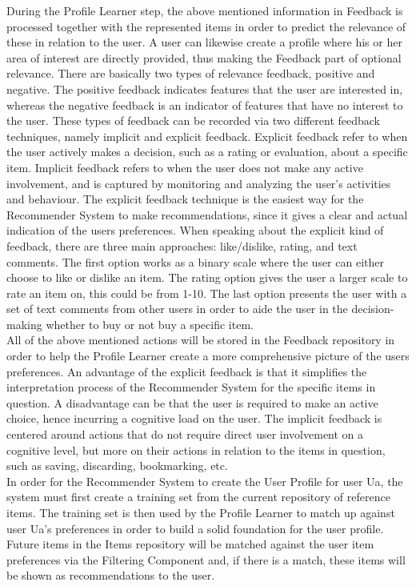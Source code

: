 During the Profile Learner step, the above mentioned information in Feedback is processed together with the represented items in order to predict the relevance of these in relation to the user. A user can likewise create a profile where his or her area of interest are directly provided, thus making the Feedback part of optional relevance.
There are basically two types of relevance feedback, positive and negative. The positive feedback indicates features that the user are interested in, whereas the negative feedback is an indicator of features that have no interest to the user. 
These types of feedback can be recorded via two different feedback techniques, namely implicit and explicit feedback. Explicit feedback refer to when the user actively makes a decision, such as a rating or evaluation, about a specific item. Implicit feedback refers to when the user does not make any active involvement, and is captured by monitoring and analyzing the user’s activities and behaviour.
The explicit feedback technique is the easiest way for the Recommender System to make recommendations, since it gives a clear and actual indication of the users preferences. When speaking about the explicit kind of feedback, there are three main approaches: like/dislike, rating, and text comments.
The first option works as a binary scale where the user can either choose to like or dislike an item.
The rating option gives the user a larger scale to rate an item on, this could be from 1-10.
The last option presents the user with a set of text comments from other users in order to aide the user in the decision-making whether to buy or not buy a specific item.\\

All of the above mentioned actions will be stored in the Feedback repository in order to help the Profile Learner create a more comprehensive picture of the users preferences. An advantage of the explicit feedback is that it simplifies the interpretation process of the Recommender System for the specific items in question. A disadvantage can be that the user is required to make an active choice, hence incurring a cognitive load on the user. The implicit feedback is centered around actions that do not require direct user involvement on a cognitive level, but more on their actions in relation to the items in question, such as saving, discarding, bookmarking, etc.\\

In order for the Recommender System to create the User Profile for user Ua, the system must first create a training set from the current repository of reference items. The training set is then used by the Profile Learner to match up against user Ua’s preferences in order to build a solid foundation for the user profile. Future items in the Items repository will be matched against the user item preferences via the Filtering Component and, if there is a match, these items will be shown as recommendations to the user. \\

